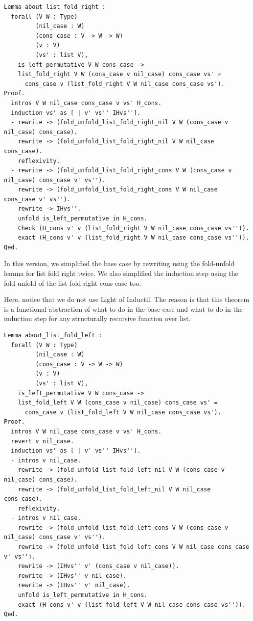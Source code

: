 \documentclass{article}
\begin{document}
\begin{lstlisting}
Lemma about_list_fold_right :
  forall (V W : Type)
         (nil_case : W)
         (cons_case : V -> W -> W)
         (v : V)
         (vs' : list V),
    is_left_permutative V W cons_case ->
    list_fold_right V W (cons_case v nil_case) cons_case vs' =
      cons_case v (list_fold_right V W nil_case cons_case vs').
Proof.
  intros V W nil_case cons_case v vs' H_cons.
  induction vs' as [ | v' vs'' IHvs''].
  - rewrite -> (fold_unfold_list_fold_right_nil V W (cons_case v nil_case) cons_case).
    rewrite -> (fold_unfold_list_fold_right_nil V W nil_case cons_case).
    reflexivity.
  - rewrite -> (fold_unfold_list_fold_right_cons V W (cons_case v nil_case) cons_case v' vs'').
    rewrite -> (fold_unfold_list_fold_right_cons V W nil_case cons_case v' vs'').
    rewrite -> IHvs''.
    unfold is_left_permutative in H_cons.
    Check (H_cons v' v (list_fold_right V W nil_case cons_case vs'')).
    exact (H_cons v' v (list_fold_right V W nil_case cons_case vs'')).
Qed.
\end{lstlisting}

In this version, we simplified the base case by rewriting using the fold-unfold lemma for list fold right twice. We also simplified the induction step using the fold-unfold of the list fold right cons case too.  

Here, notice that we do not use Light of Inductil. The reason is that this theorem is a functional abstraction of what to do in the base case and what to do in the induction step for any structurally recursive function over list. 

\begin{lstlisting}
Lemma about_list_fold_left :
  forall (V W : Type)
         (nil_case : W)
         (cons_case : V -> W -> W)
         (v : V)
         (vs' : list V),
    is_left_permutative V W cons_case ->
    list_fold_left V W (cons_case v nil_case) cons_case vs' =
      cons_case v (list_fold_left V W nil_case cons_case vs').
Proof.
  intros V W nil_case cons_case v vs' H_cons.
  revert v nil_case.
  induction vs' as [ | v' vs'' IHvs''].
  - intros v nil_case.
    rewrite -> (fold_unfold_list_fold_left_nil V W (cons_case v nil_case) cons_case).
    rewrite -> (fold_unfold_list_fold_left_nil V W nil_case cons_case).
    reflexivity.
  - intros v nil_case.
    rewrite -> (fold_unfold_list_fold_left_cons V W (cons_case v nil_case) cons_case v' vs'').
    rewrite -> (fold_unfold_list_fold_left_cons V W nil_case cons_case v' vs'').
    rewrite -> (IHvs'' v' (cons_case v nil_case)).
    rewrite -> (IHvs'' v nil_case).
    rewrite -> (IHvs'' v' nil_case).
    unfold is_left_permutative in H_cons.
    exact (H_cons v' v (list_fold_left V W nil_case cons_case vs'')).
Qed.
\end{lstlisting}
\end{document}
